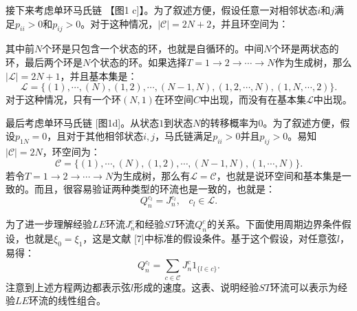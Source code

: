 接下来考虑单环马氏链 【图1 c]】。为了叙述方便，假设任意一对相邻状态$i$和$j$满足$p_{ii}>0$和$p_{ij}>0$。对于这种情况，$|\mathcal{C}| = 2N +2$，并且环空间为：

其中前$N$个环是只包含一个状态的环，也就是自循环的。中间$N$个环是两状态的环，最后两个环是$N$个状态的环。如果选择$T = 1\to 2\to\cdots \to N$作为生成树，那么$|\mathcal{L}| = 2N + 1$，并且基本集是：
\begin{equation*}
    \mathcal{L} = \{(1),\cdots,(N),(1,2),\cdots,(N-1,N),(1,2,\cdots,N),(1,N,\cdots,2)\}.
\end{equation*}
对于这种情况，只有一个环$(N, 1)$在环空间$C$中出现，而没有在基本集$\mathcal{L}$中出现。

最后考虑单环马氏链 [图1d]。从状态$1$到状态$N$的转移概率为$0$。为了叙述方便，假设$p_{1N}=0$，且对于其他相邻状态$i,j$，马氏链满足$p_{ii}>0$并且$p_{ij}>0$。易知$|\mathcal{C}|=2N$，环空间为：
\begin{equation*}
    \mathcal{C} = \{(1),\cdots,(N),(1,2),\cdots,(N-1,N),(1,\cdots,N)\}.
\end{equation*}
若令$T = 1\to 2\to\cdots \to N$为生成树，那么有$\mathcal{L} = \mathcal{C}$，也就是说环空间和基本集是一致的。而且，很容易验证两种类型的环流也是一致的，也就是：
\begin{equation}\label{same cycle current}
    Q_n^{c_l} = J^{c_l}_n,\;\;\;c_l\in \mathcal{L}.
\end{equation}

为了进一步理解经验$LE$环流$J_n^c$和经验$ST$环流$Q_n^c$的关系。下面使用周期边界条件假设，也就是$\xi_0 = \xi_1$，这是文献 [7]中标准的假设条件。基于这个假设，对任意弦$l$，易得：
\begin{equation}\label{conversion}
    Q_n^{c_l} = \sum_{c\in\mathcal{C}}J^c_n1_{\{l\in c\}}.
\end{equation}
注意到上述方程两边都表示弦$l$形成的速度。这表、说明经验$ST$环流可以表示为经验$LE$环流的线性组合。